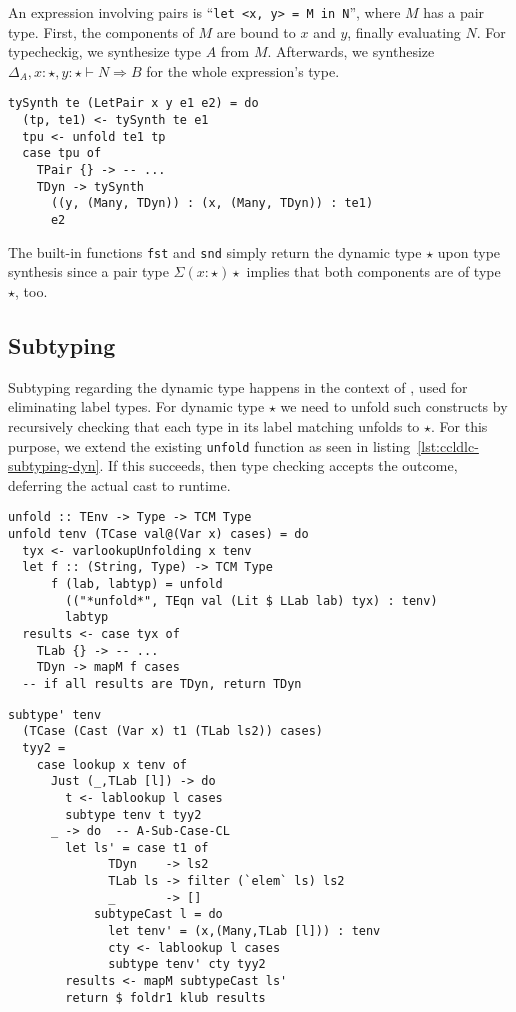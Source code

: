 An expression involving pairs is ``\lstinline[language=ldgv]!let <x, y> = M in N!'', where $M$ has a pair type. First, the components of $M$ are bound to $x$ and $y$, finally evaluating $N$. For typecheckig, we synthesize type $A$ from $M$. Afterwards, we synthesize $\Delta_A, x:\star, y:\star \vdash N \Rightarrow B$ for the whole expression's type.

\begin{lstlisting}[caption=Pair type synthesis (\texttt{TCTyping.hs})]
tySynth te (LetPair x y e1 e2) = do
  (tp, te1) <- tySynth te e1
  tpu <- unfold te1 tp
  case tpu of
    TPair {} -> -- ...
    TDyn -> tySynth
      ((y, (Many, TDyn)) : (x, (Many, TDyn)) : te1)
      e2
\end{lstlisting}

The built-in functions \texttt{fst} and \texttt{snd} simply return the dynamic type $\star$ upon type synthesis since a pair type $\Sigma(x:\star)\star$ implies that both components are of type $\star$, too.

\subsection{Subtyping}

Subtyping regarding the dynamic type happens in the context of \case, used for eliminating label types. For dynamic type $\star$ we need to unfold such \case constructs by recursively checking that each type in its label matching unfolds to $\star$. For this purpose, we extend the existing \texttt{unfold} function as seen in listing~\ref{lst:ccldlc-subtyping-dyn}. If this succeeds, then type checking accepts the outcome, deferring the actual cast to runtime.

\begin{lstlisting}[float,
	caption=Unfolding to $\star$ in case terms (\texttt{TCSubtyping.hs}),
	label=lst:ccldlc-subtyping-dyn]
unfold :: TEnv -> Type -> TCM Type
unfold tenv (TCase val@(Var x) cases) = do
  tyx <- varlookupUnfolding x tenv
  let f :: (String, Type) -> TCM Type
      f (lab, labtyp) = unfold
        (("*unfold*", TEqn val (Lit $ LLab lab) tyx) : tenv)
        labtyp
  results <- case tyx of
    TLab {} -> -- ...
    TDyn -> mapM f cases
  -- if all results are TDyn, return TDyn
\end{lstlisting}

\begin{lstlisting}[float,
	caption=Subtyping for casts in case terms (\texttt{TCSubtyping.hs}),
	label=lst:ccldgv-cast-subtyping]
subtype' tenv
  (TCase (Cast (Var x) t1 (TLab ls2)) cases)
  tyy2 =
    case lookup x tenv of
      Just (_,TLab [l]) -> do
        t <- lablookup l cases
        subtype tenv t tyy2
      _ -> do  -- A-Sub-Case-CL
        let ls' = case t1 of
              TDyn    -> ls2
              TLab ls -> filter (`elem` ls) ls2
              _       -> []
            subtypeCast l = do
              let tenv' = (x,(Many,TLab [l])) : tenv
              cty <- lablookup l cases
              subtype tenv' cty tyy2
        results <- mapM subtypeCast ls'
        return $ foldr1 klub results
\end{lstlisting}

